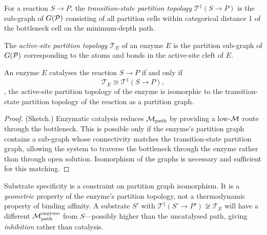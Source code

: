 \begin{definition}
\label{def:ts_topology}
For a reaction $S \to P$, the \emph{transition-state partition topology}
$\mathcal{T}^\ddagger(S \to P)$ is the sub-graph of $G(\mathcal{P})$ consisting
of all partition cells within categorical distance 1 of the bottleneck cell
on the minimum-depth path.
\end{definition}

\begin{definition}
\label{def:active_site_topology}
The \emph{active-site partition topology} $\mathcal{T}_E$ of an enzyme $E$
is the partition sub-graph of $G(\mathcal{P})$ corresponding to the atoms and
bonds in the active-site cleft of $E$.
\end{definition}

\begin{theorem}
\label{thm:specificity}
An enzyme $E$ catalyses the reaction $S \to P$ if and only if
\begin{equation}
  \mathcal{T}_E \cong \mathcal{T}^\ddagger(S \to P),
  \label{eq:topological_isomorphism}
\end{equation}
\ie, the active-site partition topology of the enzyme is isomorphic to the
transition-state partition topology of the reaction as a partition graph.
\end{theorem}

\begin{proof}
(Sketch.) Enzymatic catalysis reduces $\mathcal{M}_{\mathrm{path}}$ by providing
a low-$\mathcal{M}$ route through the bottleneck. This is possible only if the
enzyme's partition graph contains a sub-graph whose connectivity matches
the transition-state partition graph, allowing the system to traverse the
bottleneck through the enzyme rather than through open solution. Isomorphism
of the graphs is necessary and sufficient for this matching.
\end{proof}

\begin{corollary}
\label{cor:geometric_specificity}
Substrate specificity is a constraint on partition graph isomorphism.
It is a \emph{geometric} property of the enzyme's partition topology,
not a thermodynamic property of binding affinity. A substrate $S'$ with
$\mathcal{T}^\ddagger(S' \to P') \not\cong \mathcal{T}_E$ will have a
different $\mathcal{M}_{\mathrm{path}}^{\mathrm{enzyme}}$ from $S$---possibly
higher than the uncatalysed path, giving \emph{inhibition} rather than
catalysis.
\end{corollary}

